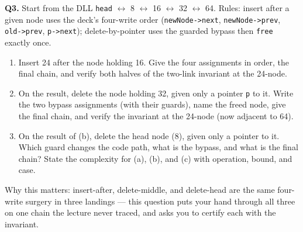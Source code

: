 \documentclass[11pt]{article}
\begin{document}
\textbf{Q3.} Start from the DLL \texttt{head} $\leftrightarrow$ 8 $\leftrightarrow$ 16 $\leftrightarrow$ 32 $\leftrightarrow$ 64. Rules: insert after a given node uses the deck's four-write order (\texttt{newNode->next}, \texttt{newNode->prev}, \texttt{old->prev}, \texttt{p->next}); delete-by-pointer uses the guarded bypass then \texttt{free} exactly once.
\begin{enumerate}
  \item[(a)] Insert 24 after the node holding 16. Give the four assignments in order, the final chain, and verify both halves of the two-link invariant at the 24-node.
  \item[(b)] On the result, delete the node holding 32, given only a pointer \texttt{p} to it. Write the two bypass assignments (with their guards), name the freed node, give the final chain, and verify the invariant at the 24-node (now adjacent to 64).
  \item[(c)] On the result of (b), delete the head node (8), given only a pointer to it. Which guard changes the code path, what is the bypass, and what is the final chain? State the complexity for (a), (b), and (c) with operation, bound, and case.
\end{enumerate}
Why this matters: insert-after, delete-middle, and delete-head are the same four-write surgery in three landings --- this question puts your hand through all three on one chain the lecture never traced, and asks you to certify each with the invariant.
\end{document}
